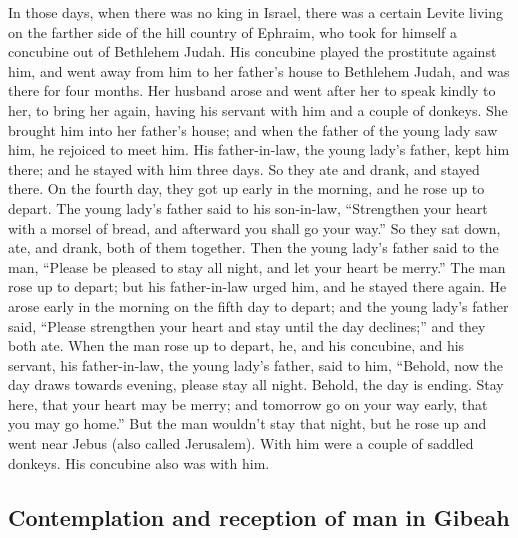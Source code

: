  In those days, when there was no king in Israel, there
was a certain Levite living on the farther side of the hill country of
Ephraim, who took for himself a concubine out of Bethlehem Judah.
 His concubine played the prostitute against him, and went
away from him to her father's house to Bethlehem Judah, and was there
for four months.  Her husband arose and went after her to
speak kindly to her, to bring her again, having his servant with him and
a couple of donkeys. She brought him into her father's house; and when
the father of the young lady saw him, he rejoiced to meet him.
 His father-in-law, the young lady's father, kept him
there; and he stayed with him three days. So they ate and drank, and
stayed there.  On the fourth day, they got up early in the
morning, and he rose up to depart. The young lady's father said to his
son-in-law, ``Strengthen your heart with a morsel of bread, and
afterward you shall go your way.''  So they sat down, ate,
and drank, both of them together. Then the young lady's father said to
the man, ``Please be pleased to stay all night, and let your heart be
merry.''  The man rose up to depart; but his father-in-law
urged him, and he stayed there again.  He arose early in
the morning on the fifth day to depart; and the young lady's father
said, ``Please strengthen your heart and stay until the day declines;''
and they both ate.  When the man rose up to depart, he,
and his concubine, and his servant, his father-in-law, the young lady's
father, said to him, ``Behold, now the day draws towards evening, please
stay all night. Behold, the day is ending. Stay here, that your heart
may be merry; and tomorrow go on your way early, that you may go home.''
 But the man wouldn't stay that night, but he rose up and
went near Jebus (also called Jerusalem). With him were a couple of
saddled donkeys. His concubine also was with him.

\hypertarget{contemplation-and-reception-of-man-in-gibeah}{%
\subsection{Contemplation and reception of man in
Gibeah}\label{contemplation-and-reception-of-man-in-gibeah}}

